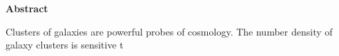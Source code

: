 \bfseries{Abstract}\mdseries\\                                                                                                
\vspace{1.0cm}                                                                                                                                  
                                                                                                                                                
Clusters of galaxies are powerful probes of cosmology. The number density of galaxy clusters is sensitive t	
                                                                                                                                                
\vspace{4.0cm}                                                                                                                                  
                                                                                                                                                
                                                                                                                                                

